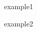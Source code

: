 \documentclass{article}
\begin{document}
\begin{TEST}{example1}
\end{TEST}

\begin{TEST*}{example2}
\end{TEST*}
\end{document}
